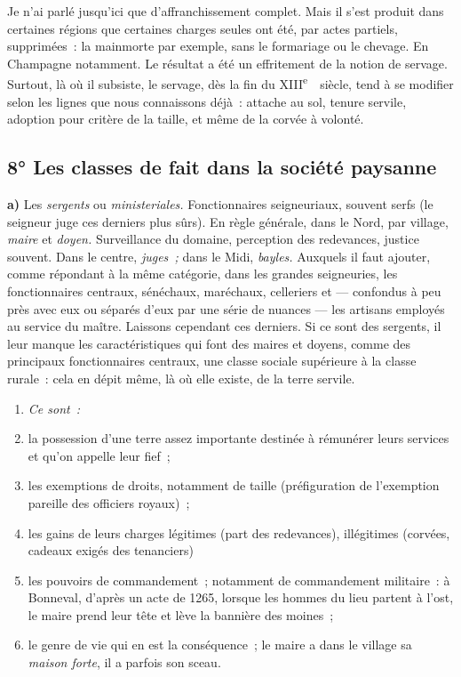 \documentclass[french,twoside]{book} %
\newlength{\listmod}
\newcommand{\listhead}[1]{\hspace{-1\listmod}\emph{#1}}
\newcommand{\labelchar}[1]{\textbf{\color{rubric} #1}}
\begin{document}
\noindent Je n’ai parlé jusqu’ici que d’affranchissement complet. Mais il s’est produit dans certaines régions que certaines charges seules ont été, par actes partiels, supprimées : la mainmorte par exemple, sans le formariage ou le chevage. En Champagne notamment. Le résultat a été un effritement de la notion de servage. Surtout, là où il subsiste, le servage, dès la fin du XIII\textsuperscript{e}  siècle, tend à se modifier selon les lignes que nous connaissons déjà : attache au sol, tenure servile, adoption pour critère de la taille, et même de la corvée à volonté.
\subsection[{8° Les classes de fait dans la société paysanne}]{8° Les classes de fait dans la société paysanne}
\noindent \labelchar{a)} Les {\itshape sergents} ou {\itshape ministeriales.} Fonctionnaires seigneuriaux, souvent serfs (le seigneur juge ces derniers plus sûrs). En règle générale, dans le Nord, par village, {\itshape maire} et {\itshape doyen.} Surveillance du domaine, perception des redevances, justice souvent. Dans le centre, {\itshape juges ;} dans le Midi, {\itshape bayles.} Auxquels il faut ajouter, comme répondant à la même catégorie, dans les grandes seigneuries, les fonctionnaires centraux, sénéchaux, maréchaux, celleriers et — confondus à peu près avec eux ou séparés d’eux par une série de nuances — les artisans employés au service du maître. Laissons cependant ces derniers. Si ce sont des sergents, il leur manque les caractéristiques qui font des maires et doyens, comme des principaux fonctionnaires centraux, une classe sociale supérieure à la classe rurale : cela en dépit même, là où elle existe, de la terre servile.\par

\begin{enumerate}[itemsep=0pt,]
\item[]\listhead{Ce sont :}
\item la possession d’une terre assez importante destinée à rémunérer leurs services et qu’on appelle leur fief ;
\item les exemptions de droits, notamment de taille (préfiguration de l’exemption pareille des officiers royaux) ;
\item les gains de leurs charges légitimes (part des  
\label{p62} redevances), illégitimes (corvées, cadeaux exigés des tenanciers)
\item les pouvoirs de commandement ; notamment de commandement militaire : à Bonneval, d’après un acte de 1265, lorsque les hommes du lieu partent à l’ost, le maire prend leur tête et lève la bannière des moines ;
\item le genre de vie qui en est la conséquence ; le maire a dans le village sa \emph{maison forte}, il a parfois son sceau.
\end{enumerate}
\end{document}
